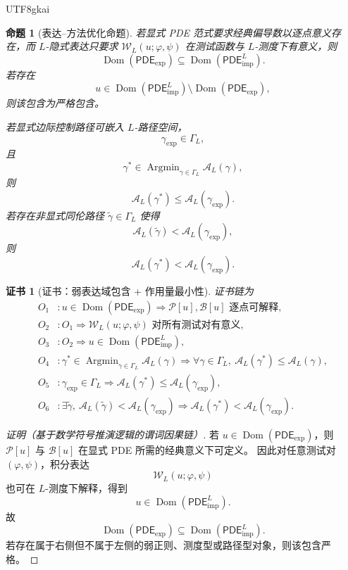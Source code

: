 \documentclass[12pt]{article}
\newtheorem{proposition}{命题}[section]
\newtheorem{Certificate}{证书}[section]
\newcommand{\Pcal}{\mathcal P}
\newcommand{\Bcal}{\mathcal B}
\newcommand{\PDE}{\ensuremath{\mathsf{PDE}}}
\DeclareMathOperator{\Dom}{Dom}
\DeclareMathOperator*{\Argmin}{Argmin}
\begin{document}
\begin{CJK*}{UTF8}{gkai}
\begin{proposition}[表达--方法优化命题]
\label{prop:tex58-expression-method-optimization}
若显式 PDE 范式要求经典偏导数以逐点意义存在，而 \(L\)-隐式表达只要求
\(\mathcal W_L(u;\varphi,\psi)\) 在测试函数与 \(L\)-测度下有意义，则
\[
  \Dom(\PDE_{\mathrm{exp}})
  \subseteq
  \Dom(\PDE_{\mathrm{imp}}^L).
\]
若存在
\[
  u\in
  \Dom(\PDE_{\mathrm{imp}}^L)
  \setminus
  \Dom(\PDE_{\mathrm{exp}}),
\]
则该包含为严格包含。

若显式边际控制路径可嵌入 \(L\)-路径空间，
\[
  \gamma_{\mathrm{exp}}\in\Gamma_L,
\]
且
\[
  \gamma^\ast\in\Argmin_{\gamma\in\Gamma_L}\mathcal A_L(\gamma),
\]
则
\[
  \mathcal A_L(\gamma^\ast)
  \le
  \mathcal A_L(\gamma_{\mathrm{exp}}).
\]
若存在非显式同伦路径 \(\widetilde\gamma\in\Gamma_L\) 使得
\[
  \mathcal A_L(\widetilde\gamma)
  <
  \mathcal A_L(\gamma_{\mathrm{exp}}),
\]
则
\[
  \mathcal A_L(\gamma^\ast)
  <
  \mathcal A_L(\gamma_{\mathrm{exp}}).
\]
\end{proposition}

\begin{Certificate}[证书：弱表达域包含 + 作用量最小性]
\label{cert:tex58-expression-method-optimization}
证书链为
\[
\begin{aligned}
  O_1 &: u\in\Dom(\PDE_{\mathrm{exp}})
  \Rightarrow
  \Pcal[u],\Bcal[u]\text{ 逐点可解释},\\
  O_2 &: O_1\Rightarrow
  \mathcal W_L(u;\varphi,\psi)\text{ 对所有测试对有意义},\\
  O_3 &: O_2\Rightarrow u\in\Dom(\PDE_{\mathrm{imp}}^L),\\
  O_4 &: \gamma^\ast\in\Argmin_{\gamma\in\Gamma_L}\mathcal A_L(\gamma)
  \Rightarrow
  \forall\gamma\in\Gamma_L,\ \mathcal A_L(\gamma^\ast)\le\mathcal A_L(\gamma),\\
  O_5 &: \gamma_{\mathrm{exp}}\in\Gamma_L
  \Rightarrow
  \mathcal A_L(\gamma^\ast)\le\mathcal A_L(\gamma_{\mathrm{exp}}),\\
  O_6 &: \exists\widetilde\gamma,\
  \mathcal A_L(\widetilde\gamma)<\mathcal A_L(\gamma_{\mathrm{exp}})
  \Rightarrow
  \mathcal A_L(\gamma^\ast)<\mathcal A_L(\gamma_{\mathrm{exp}}).
\end{aligned}
\]
\end{Certificate}

\begin{proof}[证明（基于数学符号推演逻辑的谓词因果链）]
若 \(u\in\Dom(\PDE_{\mathrm{exp}})\)，则 \(\Pcal[u]\) 与 \(\Bcal[u]\) 在显式 PDE 所需的经典意义下可定义。
因此对任意测试对 \((\varphi,\psi)\)，积分表达
\[
  \mathcal W_L(u;\varphi,\psi)
\]
也可在 \(L\)-测度下解释，得到
\[
  u\in\Dom(\PDE_{\mathrm{imp}}^L).
\]
故
\[
  \Dom(\PDE_{\mathrm{exp}})
  \subseteq
  \Dom(\PDE_{\mathrm{imp}}^L).
\]
若存在属于右侧但不属于左侧的弱正则、测度型或路径型对象，则该包含严格。


\end{proof}
\end{CJK*}
\end{document}
